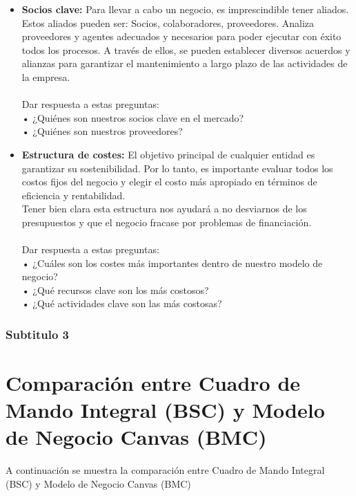 \documentclass[preprint,12pt]{elsarticle}
\begin{document}
\begin{itemize}
	\item {\textbf{Socios clave: }} Para llevar a cabo un negocio, es imprescindible tener aliados. Estos aliados pueden ser: Socios, colaboradores, proveedores. Analiza proveedores y agentes adecuados y necesarios para poder ejecutar con éxito todos los procesos. A través de ellos, se pueden establecer diversos acuerdos y alianzas para garantizar el mantenimiento a largo plazo de las actividades de la empresa. \\\\Dar respuesta a estas preguntas:\\ • ¿Quiénes son nuestros socios clave en el mercado? \\ • ¿Quiénes son nuestros proveedores?
	\item {\textbf{Estructura de costes: }}El objetivo principal de cualquier entidad es garantizar su sostenibilidad. Por lo tanto, es importante evaluar todos los costos fijos del negocio y elegir el costo más apropiado en términos de eficiencia y rentabilidad. \\ Tener bien clara esta estructura nos ayudará a no desviarnos de los presupuestos y que el negocio fracase por problemas de financiación. \\\\Dar respuesta a estas preguntas:\\ •  ¿Cuáles son los costes más importantes dentro de nuestro modelo de negocio?\\ •  ¿Qué recursos clave son los más costosos? \\ • ¿Qué actividades clave son las más costosas?
	\end{itemize}

	\subsubsection{\textbf{Subtitulo 3}}







\section{Comparación entre Cuadro de Mando Integral (BSC) y Modelo de Negocio Canvas (BMC)}
A continuación se muestra la comparación entre Cuadro de Mando Integral (BSC) y Modelo de Negocio Canvas (BMC)
	
\end{document}
